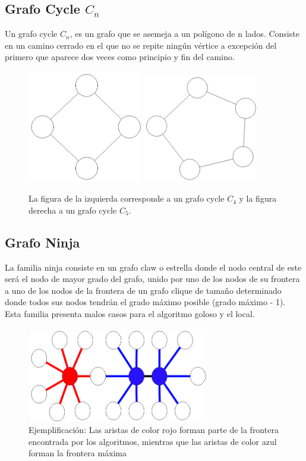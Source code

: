 \subsection{Grafo Cycle $C_n$}
Un grafo cycle $C_n$, es un grafo que se asemeja a un polígono de n lados. Consiste en un camino cerrado en el que no se repite ningún vértice a excepción del primero que aparece dos veces como principio y fin del camino. 

\begin{figure}[H]
\centering
\includegraphics[width=50mm]{C_4.png}
\includegraphics[width=50mm]{C_5.png}
\caption{La figura de la izquierda corresponde a un grafo cycle $C_4$ y la figura derecha a un grafo cycle $C_5$.}
\label{overflow}
\end{figure}

\subsection{Grafo Ninja}
La familia ninja consiste en un grafo claw o estrella donde el nodo central de este será el nodo de mayor grado del grafo, unido por uno de los nodos de su frontera a uno de los nodos de la frontera de un grafo clique de tamaño determinado donde todos sus nodos tendrán el grado máximo posible (grado máximo - 1). Esta familia presenta malos casos para el algoritmo goloso y el local.

\begin{figure}[H]
\centering
\includegraphics[width=80mm]{ejemploErrorGoloso.png}
\caption{Ejemplificación: Las aristas de color rojo forman parte de la frontera encontrada por los algoritmos, mientras que las aristas de color azul forman la frontera máxima}
\label{overflow}
\end{figure}


